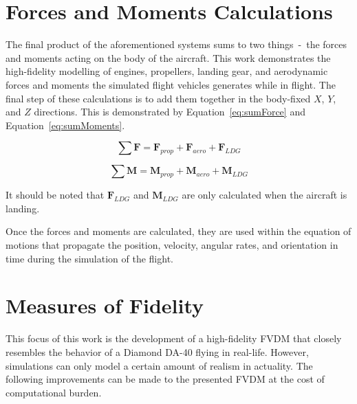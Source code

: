 \section{\textbf{Forces and Moments Calculations}}
The final product of the aforementioned systems sums to two things~-~the forces and moments acting on the body of the aircraft. This work demonstrates the high-fidelity modelling of engines, propellers, landing gear, and aerodynamic forces and moments the simulated flight vehicles generates while in flight. The final step of these calculations is to add them together in the body-fixed \(X\), \(Y\), and \(Z\) directions. This is demonstrated by Equation~\ref{eq:sumForce} and Equation~\ref{eq:sumMoments}.

\begin{equation}
    \sum \mathbf{F} = \mathbf{F}_{prop} + \mathbf{F}_{aero} + \mathbf{F}_{LDG}
    \label{eq:sumForce}
\end{equation}

\begin{equation}
    \sum \mathbf{M} = \mathbf{M}_{prop} + \mathbf{M}_{aero} + \mathbf{M}_{LDG}
    \label{eq:sumMoments}
\end{equation}

It should be noted that \(\mathbf{F}_{LDG}\) and \(\mathbf{M}_{LDG}\) are only calculated when the aircraft is landing.

Once the forces and moments are calculated, they are used within the equation of motions that propagate the position, velocity, angular rates, and orientation in time during the simulation of the flight.

\section{\textbf{Measures of Fidelity}}
This focus of this work is the development of a high-fidelity FVDM that closely resembles the behavior of a Diamond DA-40 flying in real-life. However, simulations can only model a certain amount of realism in actuality. The following improvements can be made to the presented FVDM at the cost of computational burden.

